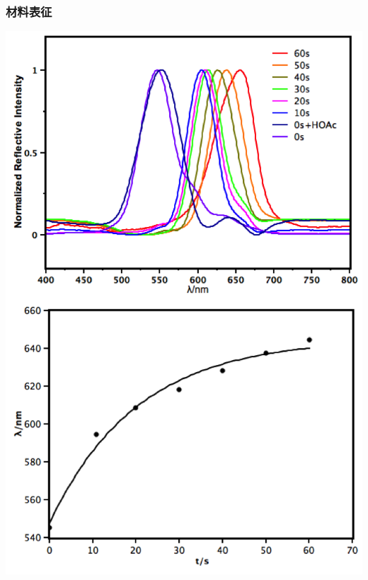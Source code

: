 \documentclass{beamer}
\begin{document}
\begin{frame}
  \frametitle{材料表征}
  \begin{minipage}{0.48\textwidth}
    \centering
    \includegraphics[width=0.85\linewidth]{figures/Spectra-UV.png}
  \end{minipage}
  \hfill
  \begin{minipage}{0.48\textwidth}
    \centering

\end{minipage}
\end{frame}
\end{document}
